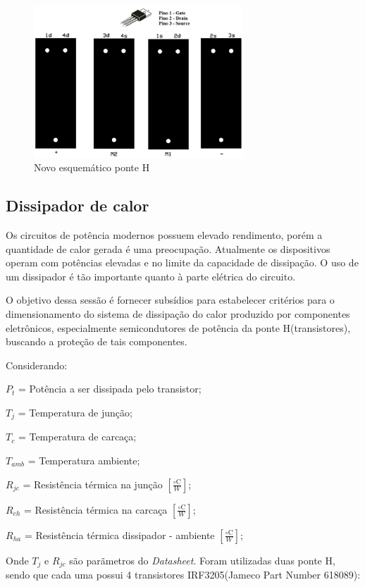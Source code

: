 \begin{figure}[!ht]
  \center
  \includegraphics[width=0.7\textwidth]{figuras/resultados/novo_esquematico_ponte_h}
  \caption{Novo esquemático ponte H}
  \label{fig:novo_esquematico_ponte_h}
\end{figure}


\subsection{Dissipador de calor}

Os circuitos de potência modernos possuem elevado rendimento, porém a quantidade de
calor gerada é uma preocupação. Atualmente os dispositivos operam com potências elevadas
e no limite da capacidade de dissipação. O uso de um dissipador é tão importante quanto à
parte elétrica do circuito.

O objetivo dessa sessão é fornecer subsídios para estabelecer critérios para o
dimensionamento do sistema de dissipação do calor produzido por componentes eletrônicos,
especialmente semicondutores de potência da ponte H(transistores), buscando a proteção de
tais componentes.

Considerando:

$P_t$ = Potência a ser dissipada pelo transistor;

$T_j$ = Temperatura de junção;

$T_c$ = Temperatura de carcaça;

$T_{amb}$ = Temperatura ambiente;

$R_{jc}$ = Resistência térmica na junção $[\frac{{\circ}\mathrm{C}}{W}]$;

$R_{ch}$ = Resistência térmica na carcaça $[\frac{{\circ}\mathrm{C}}{W}]$;

$R_{ha}$ = Resistência térmica dissipador - ambiente $[\frac{{\circ}\mathrm{C}}{W}]$;

Onde $T_j$ e $R_{jc}$ são parãmetros do \textit{Datasheet}. Foram utilizadas duas ponte H, sendo
que cada uma possui 4 transistores IRF3205(Jameco Part Number 618089)\cite{jameco}:

